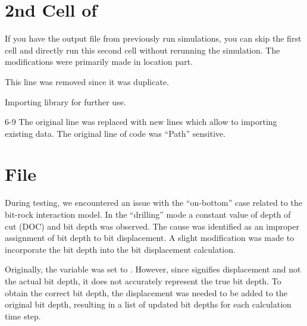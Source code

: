 \section{2nd Cell of }
If you have the output file from previously run simulations, you can skip the first cell and directly run this second cell without rerunning the simulation. The modifications were primarily made in location part.
\begin{codemodifications}

\begin{codemodification}{1}
This line was removed since it was duplicate.
\end{codemodification}

\begin{codemodification}{5}
Importing  library for further use.
\end{codemodification}

\begin{codemodification}{6-9}
The original line was replaced with new lines which allow to importing existing data.  The original line of code was ``Path'' sensitive.
\end{codemodification}

\end{codemodifications}

\section{File }
During testing, we encountered an issue with the ``on-bottom'' case related to the bit-rock interaction model. In the ``drilling'' mode a constant value of depth of cut (DOC) and bit depth was observed. The cause was identified as an improper assignment of bit depth to bit displacement. A slight modification was made to incorporate the bit depth into the bit displacement calculation.


\begin{codemodifications}

\begin{codemodification}{29}
Originally, the variable  was set to . However, since  signifies displacement and not the actual bit depth, it does not accurately represent the true bit depth. To obtain the correct bit depth, the displacement was needed to be added to the original bit depth, resulting in a list of updated bit depths for each calculation time step.
\end{codemodification}
\end{codemodifications}

